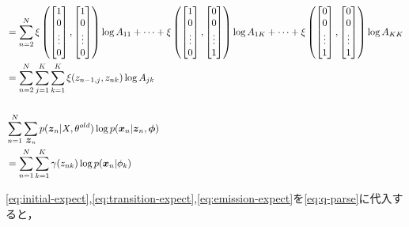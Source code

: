 \begin{align}
  &= \sum_{n=2}^N\xi\left(\begin{bmatrix} 1 \\ 0 \\ \vdots \\ 0 \\ \end{bmatrix},\begin{bmatrix} 1 \\ 0 \\ \vdots \\ 0 \\ \end{bmatrix}\right)\log A_{11} + \dots + \xi\left(\begin{bmatrix} 1 \\ 0 \\ \vdots \\ 0 \\ \end{bmatrix},\begin{bmatrix} 0 \\ 0 \\ \vdots \\ 1 \\ \end{bmatrix}\right)\log A_{1K} + \dots + \xi\left(\begin{bmatrix} 0 \\ 0 \\ \vdots \\ 1 \\ \end{bmatrix},\begin{bmatrix} 0 \\ 0 \\ \vdots \\ 1 \\ \end{bmatrix}\right)\log A_{KK} \\
  &= \sum_{n=2}^N\sum_{j=1}^K\sum_{k=1}^K\xi(z_{n-1,j},z_{nk})\log A_{jk} \label{eq:transition-expect} \\\\
  &\sum_{n=1}^N\sum_{\mbox{\boldmath $z$}_n}p(\mbox{\boldmath $z$}_n|X,\theta^{old})\log p(\mbox{\boldmath $x$}_n|\mbox{\boldmath $z$}_n,\mbox{\boldmath $\phi$}) \\
  &= \sum_{n=1}^N\sum_{k=1}^K\gamma(z_{nk})\log p(\mbox{\boldmath $x$}_n|\phi_k) \label{eq:emission-expect} \\
\end{align}


\eqref{eq:initial-expect},\eqref{eq:transition-expect},\eqref{eq:emission-expect}を\eqref{eq:q-parse}に代入すると，

